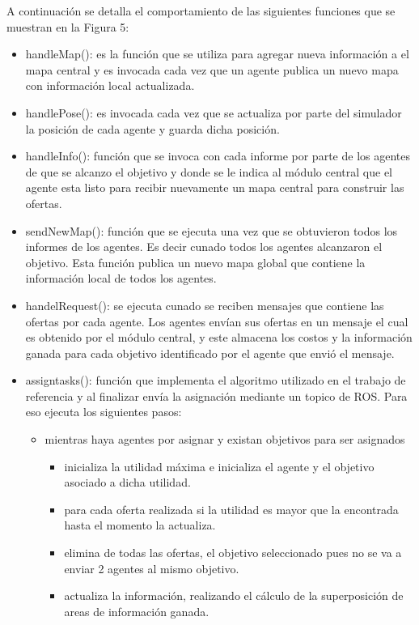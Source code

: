 \documentclass[runningheads]{llncs}
\begin{document}
A continuación se detalla el comportamiento de las siguientes funciones que se muestran en la Figura 5: 
\begin{itemize}
	\item handleMap(): es la función que se utiliza para agregar nueva información a el mapa central y es invocada cada vez que un agente publica un nuevo mapa con información local actualizada. 
	\item handlePose(): es invocada cada vez que se actualiza por parte del simulador la posición de cada agente y guarda dicha posición.
	\item handleInfo(): función que se invoca con cada informe por parte de los agentes de que se alcanzo el objetivo y donde se le indica al módulo central que el agente esta listo para recibir nuevamente un mapa central para construir las ofertas.
	\item sendNewMap(): función que se ejecuta una vez que se obtuvieron todos los informes de los agentes. Es decir cunado todos los agentes alcanzaron el objetivo. Esta función publica un nuevo mapa global que contiene la información local de todos los agentes.
	\item handelRequest(): se ejecuta cunado se reciben mensajes que contiene las ofertas por cada agente. Los agentes envían sus ofertas en un mensaje el cual es obtenido por el módulo central, y este almacena los costos y la información ganada para cada objetivo identificado por el agente que envió el mensaje.
	\item assigntasks(): función que implementa el algoritmo utilizado en el trabajo de referencia y al finalizar envía la asignación mediante un topico de ROS. Para eso ejecuta los siguientes pasos:
	
	\begin{itemize}
		\item mientras haya agentes por asignar y existan objetivos para ser asignados
		\begin{itemize}
			\item inicializa la utilidad máxima e inicializa el agente y el objetivo asociado a dicha utilidad.
			\item para cada oferta realizada si la utilidad es mayor que la encontrada hasta el momento la actualiza.
			\item elimina de todas las ofertas, el objetivo seleccionado pues no se va a enviar 2 agentes al mismo objetivo.
			\item actualiza la información, realizando el cálculo de la superposición de areas de información ganada.
		\end{itemize}
	\end{itemize}
	
\end{itemize}
\end{document}

